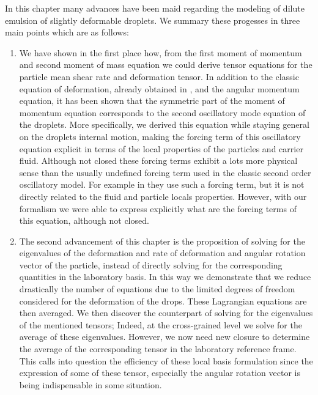 
In this chapter many advances have been maid regarding the modeling of dilute emulsion of slightly deformable droplets. 
We summary these progesses in three main points which are as follows: 
\begin{enumerate}
    \item We have shown in the first place how, from the first moment of momentum and second moment of mass equation we could derive tensor equations for the particle mean shear rate and deformation tensor. 
In addition to the classic equation of deformation, already obtained in \citet{goddard1967nonlinear},  and the angular momentum equation, it has been shown that the symmetric part of the moment of momentum equation corresponds to the second oscillatory mode equation of the droplets. 
More specifically, we derived this equation while staying general on the droplets internal motion, making the forcing term of this oscillatory equation explicit in terms of the local properties of the particles and carrier fluid. 
Although not closed these forcing terms exhibit a lots more physical sense than the usually undefined  forcing term used in the classic second order oscillatory model.
For example in \citet{riviere2021sub} they  use such a forcing term, but it is not directly related to the fluid and particle locals properties.
However, with our formalism we were able to express explicitly what are the forcing terms of this equation, although not closed. 

\item 
The second advancement of this chapter is the proposition of solving for the eigenvalues of the deformation and rate of deformation and angular rotation vector of the particle, instead of directly solving for the corresponding quantities in the laboratory basis. 
In this way we demonstrate that we reduce drastically the number of equations due to the limited degrees of freedom considered for the deformation of the drops. 
These Lagrangian equations are then averaged. 
We then discover the counterpart of solving for the eigenvalues of the mentioned tensors; 
Indeed, at the cross-grained level we solve for the average of these eigenvalues. 
However, we now need new closure to determine the average of the corresponding tensor in the laboratory reference frame.  
This calls into question the efficiency of these local basis formulation since the expression of some of these tensor, especially the angular rotation vector is being indispensable in some situation. 


\end{enumerate}
